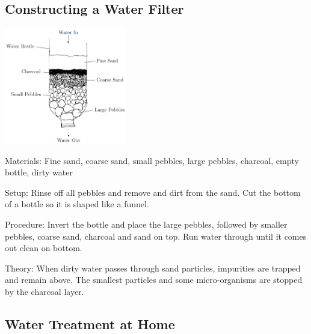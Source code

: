 \begin{multicols}{2}
\columnbreak

\subsection{Constructing a Water Filter} 

\begin{center}
\includegraphics[width=0.4\textwidth]{./img/water-filter.png}
\end{center}

\begin{description*}
\item[Materials:]{Fine sand, coarse sand, small pebbles, large pebbles, charcoal, empty bottle, dirty water}
\item[Setup:]{Rinse off all pebbles and remove and dirt from the sand. Cut the bottom of a bottle so it is shaped like a funnel.}
\item[Procedure:]{Invert the bottle and place the large pebbles, followed by smaller pebbles, coarse sand, charcoal and sand on top. Run water through until it comes out clean on bottom.}
\item[Theory:]{When dirty water passes through sand particles, impurities are trapped and
remain above. The smallest particles and some micro-organisms are stopped
by the charcoal layer.}
\end{description*}


\subsection{Water Treatment at Home}


\end{multicols}
